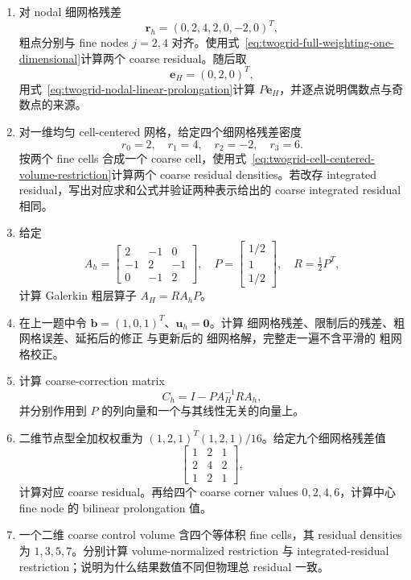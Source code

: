 \begin{enumerate}[label=\arabic*.]
\item 对 nodal 细网格残差
\[
\bm r_h=(0,2,4,2,0,-2,0)^T,
\]
粗点分别与 fine nodes $j=2,4$ 对齐。使用式~\eqref{eq:twogrid-full-weighting-one-dimensional}计算两个 coarse residual。随后取
\[
\bm e_H=(0,2,0)^T,
\]
用式~\eqref{eq:twogrid-nodal-linear-prolongation}计算 $P\bm e_H$，并逐点说明偶数点与奇数点的来源。

\item 对一维均匀 cell-centered 网格，给定四个细网格残差密度
\[
r_0=2,\quad r_1=4,\quad r_2=-2,\quad r_3=6.
\]
按两个 fine cells 合成一个 coarse cell，使用式~\eqref{eq:twogrid-cell-centered-volume-restriction}计算两个 coarse residual densities。若改存 integrated residual，写出对应求和公式并验证两种表示给出的 coarse integrated residual 相同。

\item 给定
\[
A_h=\begin{bmatrix}2&-1&0\\-1&2&-1\\0&-1&2\end{bmatrix},\quad
P=\begin{bmatrix}1/2\\1\\1/2\end{bmatrix},\quad R=\tfrac12P^T,
\]
计算 Galerkin 粗层算子 $A_H=RA_hP$。

\item 在上一题中令 $\bm b=(1,0,1)^T$、$\bm u_h=\bm0$。计算 细网格残差、限制后的残差、粗网格误差、延拓后的修正 与更新后的 细网格解，完整走一遍不含平滑的 粗网格校正。

\item 计算 coarse-correction matrix
\[
C_h=I-PA_H^{-1}RA_h,
\]
并分别作用到 $P$ 的列向量和一个与其线性无关的向量上。

\item 二维节点型全加权权重为 $(1,2,1)^T(1,2,1)/16$。给定九个细网格残差值
\[
\begin{bmatrix}1&2&1\\2&4&2\\1&2&1\end{bmatrix},
\]
计算对应 coarse residual。再给四个 coarse corner values $0,2,4,6$，计算中心 fine node 的 bilinear prolongation 值。

\item 一个二维 coarse control volume 含四个等体积 fine cells，其 residual densities 为 $1,3,5,7$。分别计算 volume-normalized restriction 与 integrated-residual restriction；说明为什么结果数值不同但物理总 residual 一致。


\end{enumerate}
